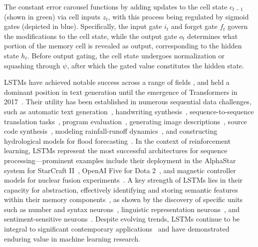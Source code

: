The constant error carousel functions by adding updates to the cell state $c_{t-1}$ (shown in green) via cell inputs $z_t$, with this process being regulated by sigmoid gates (depicted in blue). Specifically, the input gate $i_t$ and forget gate $f_t$ govern the modifications to the cell state, while the output gate $o_t$ determines what portion of the memory cell is revealed as output, corresponding to the hidden state $h_t$. Before output gating, the cell state undergoes normalization or squashing through $\psi$, after which the gated value constitutes the hidden state.

LSTMs have achieved notable success across a range of fields \citep{Hochreiter:01,Hochreiter:07,Schmidhuber:15}, and held a dominant position in text generation until the emergence of Transformers in 2017~\citep{Vaswani:17}. Their utility has been established in numerous sequential data challenges, such as automatic text generation~\citep{Graves:13,Karpathy:15blog}, handwriting synthesis~\citep{Graves:13}, sequence-to-sequence translation tasks~\citep{Sutskever:14nips}, program evaluation~\citep{Zaremba:14arxiv}, generating image descriptions~\citep{Karpathy:15,Hossain:19}, source code synthesis~\citep{Karpathy:15blog}, modeling rainfall-runoff dynamics~\citep{Kratzert:18,Kratzert:19}, and constructing hydrological models for flood forecasting~\citep{Nearing:24}. In the context of reinforcement learning, LSTMs represent the most successful architectures for sequence processing—prominent examples include their deployment in the AlphaStar system for StarCraft II~\citep{Vinyals:17short}, OpenAI Five for Dota 2~\citep{OpenAI:19}, and magnetic controller models for nuclear fusion experiments~\citep{Degrave:22short}. A key strength of LSTMs lies in their capacity for abstraction, effectively identifying and storing semantic features within their memory components~\citep{Karpathy:15blog}, as shown by the discovery of specific units such as number and syntax neurons~\citep{Lakretz:19}, linguistic representation neurons~\citep{Bau:19}, and sentiment-sensitive neurons~\citep{Radford:17arxiv}. Despite evolving trends, LSTMs continue to be integral to significant contemporary applications~\citep{Degrave:22short,Nearing:24} and have demonstrated enduring value in machine learning research.

